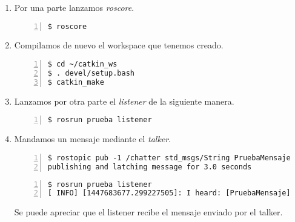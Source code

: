 	\begin{enumerate}
		\item Por una parte lanzamos \emph{roscore}.
		\begin{lstlisting}[style=consola,numbers=left]
$ roscore
		\end{lstlisting}
		
		\item Compilamos de nuevo el workspace que tenemos creado.
		\begin{lstlisting}[style=consola,numbers=left]
$ cd ~/catkin_ws
$ . devel/setup.bash
$ catkin_make
		\end{lstlisting}
		
		\item Lanzamos por otra parte el \emph{listener} de la siguiente manera.
		\begin{lstlisting}[style=consola,numbers=left]
$ rosrun prueba listener

		\end{lstlisting}

		\item Mandamos un mensaje mediante el \emph{talker}.
		\begin{lstlisting}[style=consola,numbers=left]
$ rostopic pub -1 /chatter std_msgs/String PruebaMensaje
publishing and latching message for 3.0 seconds
		\end{lstlisting}
		
		\begin{lstlisting}[style=consola,numbers=left]
$ rosrun prueba listener
[ INFO] [1447683677.299227505]: I heard: [PruebaMensaje]
		\end{lstlisting}
		
		Se puede apreciar que el listener recibe el mensaje enviado por el talker.
		
	\end{enumerate}
